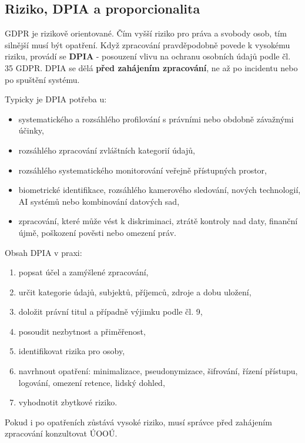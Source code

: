 
\subsection*{Riziko, DPIA a proporcionalita}
GDPR je rizikově orientované. Čím vyšší riziko pro práva a svobody osob, tím silnější musí být opatření. Když zpracování pravděpodobně povede k vysokému riziku, provádí se \textbf{DPIA} - posouzení vlivu na ochranu osobních údajů podle čl. 35 GDPR. DPIA se dělá \textbf{před zahájením zpracování}, ne až po incidentu nebo po spuštění systému.

Typicky je DPIA potřeba u:
\begin{itemize}
  \item systematického a rozsáhlého profilování s právními nebo obdobně závažnými účinky,
  \item rozsáhlého zpracování zvláštních kategorií údajů,
  \item rozsáhlého systematického monitorování veřejně přístupných prostor,
  \item biometrické identifikace, rozsáhlého kamerového sledování, nových technologií, AI systémů nebo kombinování datových sad,
  \item zpracování, které může vést k diskriminaci, ztrátě kontroly nad daty, finanční újmě, poškození pověsti nebo omezení práv.
\end{itemize}

Obsah DPIA v praxi:
\begin{enumerate}
  \item popsat účel a zamýšlené zpracování,
  \item určit kategorie údajů, subjektů, příjemců, zdroje a dobu uložení,
  \item doložit právní titul a případně výjimku podle čl. 9,
  \item posoudit nezbytnost a přiměřenost,
  \item identifikovat rizika pro osoby,
  \item navrhnout opatření: minimalizace, pseudonymizace, šifrování, řízení přístupu, logování, omezení retence, lidský dohled,
  \item vyhodnotit zbytkové riziko.
\end{enumerate}
Pokud i po opatřeních zůstává vysoké riziko, musí správce před zahájením zpracování konzultovat ÚOOÚ.

